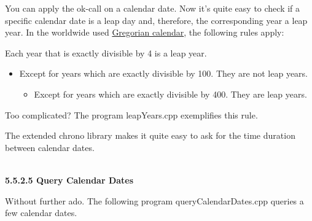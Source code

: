 You can apply the ok-call on a calendar date. Now it’s quite easy to check if a specific calendar date is a leap day and, therefore, the corresponding year a leap year. In the worldwide used \href{https://en.wikipedia.org/wiki/Gregorian_calendar}{Gregorian calendar}, the following rules apply:

Each year that is exactly divisible by 4 is a leap year.
 
\begin{itemize}
\item 
Except for years which are exactly divisible by 100. They are not leap years.

\begin{itemize}
\item 
Except for years which are exactly divisible by 400. They are leap years.
\end{itemize}
\end{itemize}

Too complicated? The program leapYears.cpp exemplifies this rule.

The extended chrono library makes it quite easy to ask for the time duration between calendar dates.

\hspace*{\fill} \\ %
\noindent
\textbf{5.5.2.5\hspace{0.2cm} Query Calendar Dates}

Without further ado. The following program queryCalendarDates.cpp queries a few calendar dates.

